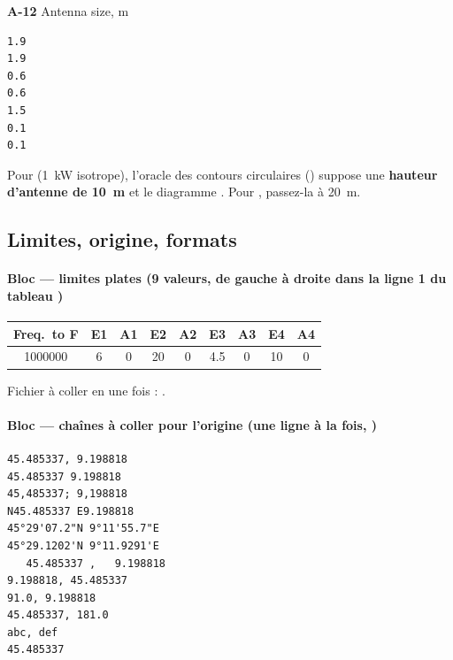 \begin{minipage}[t]{0.325\textwidth}\small\textbf{A-12} Antenna size, m\\[-2pt]
\begin{Verbatim}[frame=single,framesep=1mm,fontsize=\footnotesize,rulecolor=\color{accent}]
1.9
1.9
0.6
0.6
1.5
0.1
0.1
\end{Verbatim}
\end{minipage}\hfill
\par\medskip
\begin{note}Pour  (1~kW isotrope), l'oracle des contours circulaires () suppose une \textbf{hauteur d'antenne de 10~m} et le diagramme . Pour , passez-la à 20~m.\end{note}
\subsection{Limites, origine, formats}\label{sec:blocsC}
\paragraph*{Bloc  --- limites plates (9 valeurs, de gauche à droite dans la ligne 1 du tableau )}
\begin{center}\small\begin{tabular}{@{}ccccccccc@{}}\toprule \textbf{Freq.\ to F} & \textbf{E1} & \textbf{A1} & \textbf{E2} & \textbf{A2} & \textbf{E3} & \textbf{A3} & \textbf{E4} & \textbf{A4}\\\midrule 1000000 & 6 & 0 & 20 & 0 & 4.5 & 0 & 10 & 0\\\bottomrule\end{tabular}\end{center}
Fichier à coller en une fois : .
\paragraph*{Bloc  --- chaînes à coller pour l'origine (une ligne à la fois, )}\vspace{-2pt}
\begin{Verbatim}[frame=single,framesep=1.5mm,fontsize=\footnotesize,rulecolor=\color{accent}]
45.485337, 9.198818
45.485337 9.198818
45,485337; 9,198818
N45.485337 E9.198818
45°29'07.2"N 9°11'55.7"E
45°29.1202'N 9°11.9291'E
   45.485337 ,   9.198818   
9.198818, 45.485337
91.0, 9.198818
45.485337, 181.0
abc, def
45.485337
\end{Verbatim}
